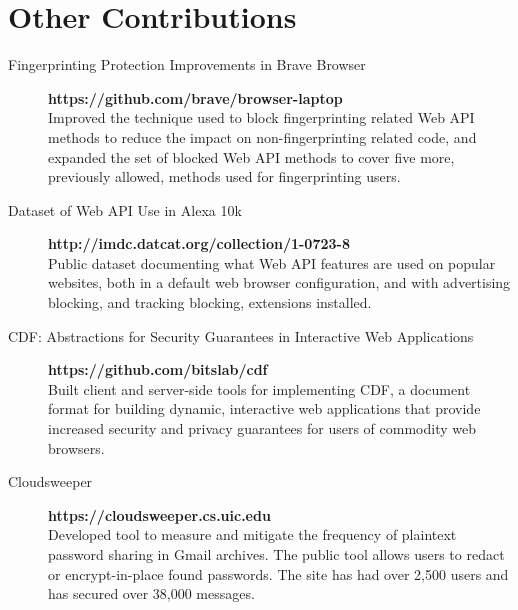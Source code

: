 \documentclass{vitae}
\begin{document}
  \section{Other Contributions}
  \begin{description}

    \item[Fingerprinting Protection Improvements in Brave Browser] \hfill \textbf{https://github.com/brave/browser-laptop}\\
    Improved the technique used to block fingerprinting related Web API methods
    to reduce the impact on non-fingerprinting related code, and expanded the set
    of blocked Web API methods to cover five more, previously allowed, methods used for fingerprinting users.

    \item[Dataset of Web API Use in Alexa 10k] \hfill \textbf{http://imdc.datcat.org/collection/1-0723-8}\\
    Public dataset documenting what Web API features are used
    on popular websites, both in a default web browser configuration, and with
    advertising blocking, and tracking blocking, extensions installed.

    \item[CDF: Abstractions for Security Guarantees in Interactive Web Applications] \hfill \textbf{https://github.com/bitslab/cdf}\\
    Built client and server-side tools for implementing CDF, a document format for building dynamic, interactive web applications
    that provide increased security and privacy guarantees for users of commodity web browsers.

    \item[Cloudsweeper] \hfill \textbf{https://cloudsweeper.cs.uic.edu}\\
    Developed tool to measure and mitigate the frequency of plaintext password sharing in Gmail archives. The public
    tool allows users to redact or encrypt-in-place found passwords. The site has had over 2,500 users and has
    secured over 38,000 messages.
  \end{description}
\end{document}
